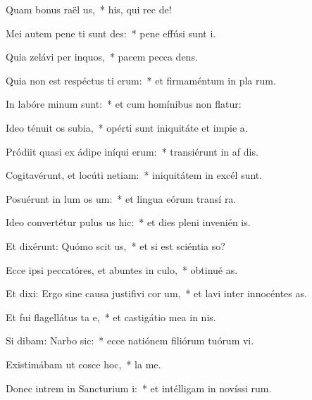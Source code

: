 \item Quam bonus raël us,~* his, qui rec  de!
\item Mei autem pene ti sunt des:~* pene effúsi sunt  i.
\item Quia zelávi per inquos,~* pacem pecca dens.
\item Quia non est respéctus ti erum:~* et firmaméntum in pla rum.
\item In labóre minum  sunt:~* et cum homínibus non flatur:
\item Ideo ténuit os subia,~* opérti sunt iniquitáte et impie a.
\item Pródiit quasi ex ádipe iníqui erum:~* transiérunt in af dis.
\item Cogitavérunt, et locúti  netiam:~* iniquitátem in excél  sunt.
\item Posuérunt in lum os um:~* et lingua eórum transí  ra.
\item Ideo convertétur pulus us hic:~* et dies pleni invenién  is.
\item Et dixérunt: Quómo scit us,~* et si est sciéntia  so?
\item Ecce ipsi peccatóres, et abuntes in culo,~* obtinué as.
\item Et dixi: Ergo sine causa justifivi cor um,~* et lavi inter innocéntes  as.
\item Et fui flagellátus ta e,~* et castigátio mea in nis.
\item Si dibam: Narbo sic:~* ecce natiónem filiórum tuórum vi.
\item Existimábam ut cosce hoc,~* la   me.
\item Donec intrem in Sancturium i:~* et intélligam in novíssi rum.
